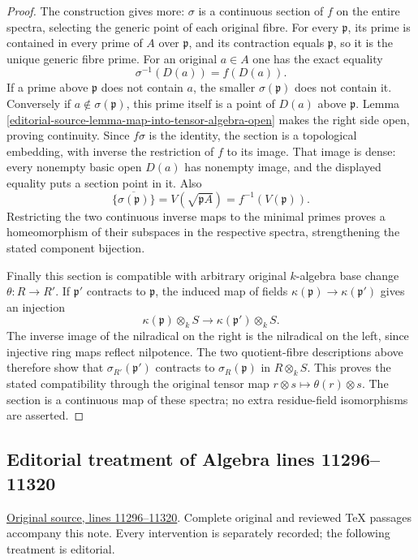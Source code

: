 \begin{proof}
The construction gives more:
$\sigma$ is a continuous section
of $f$ on the entire spectra,
selecting the generic point
of each original fibre.
For every $\mathfrak p$, its
prime is contained in every
prime of $A$ over $\mathfrak p$,
and its contraction equals
$\mathfrak p$, so it is the
unique generic fibre prime.
For an original $a\in A$ one
has the exact equality
$$
\sigma^{-1}(D(a))=f(D(a)).
$$
If a prime above $\mathfrak p$
does not contain $a$, the
smaller $\sigma(\mathfrak p)$
does not contain it. Conversely
if $a\notin\sigma(\mathfrak p)$,
this prime itself is a point
of $D(a)$ above $\mathfrak p$.
Lemma \ref{editorial-source-lemma-map-into-tensor-algebra-open}
makes the right side open,
proving continuity. Since
$f\sigma$ is the identity,
the section is a topological
embedding, with inverse the
restriction of $f$ to its
image. That image is dense:
every nonempty basic open
$D(a)$ has nonempty image,
and the displayed equality
puts a section point in it.
Also
$$
\overline{\{\sigma(\mathfrak p)\}}
=V(\sqrt{\mathfrak pA})
=f^{-1}(V(\mathfrak p)).
$$
Restricting the two continuous
inverse maps to the minimal
primes proves a homeomorphism
of their subspaces in the
respective spectra, strengthening
the stated component bijection.

Finally this section is
compatible with arbitrary
original $k$-algebra base change
$\theta:R\to R'$. If $\mathfrak p'$
contracts to $\mathfrak p$,
the induced map of fields
$\kappa(\mathfrak p)\to\kappa(\mathfrak p')$
gives an injection
$$
\kappa(\mathfrak p)\otimes_k S
\longrightarrow\kappa(\mathfrak p')\otimes_k S.
$$
The inverse image of the
nilradical on the right is
the nilradical on the left,
since injective ring maps
reflect nilpotence. The two
quotient-fibre descriptions
above therefore show that
$\sigma_{R'}(\mathfrak p')$
contracts to
$\sigma_R(\mathfrak p)$ in
$R\otimes_k S$. This proves
the stated compatibility
through the original tensor
map $r\otimes s\mapsto\theta(r)\otimes s$.
The section is a continuous
map of these spectra; no
extra residue-field
isomorphisms are asserted.
\end{proof}


\subsection{Editorial treatment of Algebra lines 11296--11320}

\hypertarget{algebra-context-142}{}

\noindent\href{https://github.com/stacks/stacks-project/blob/a04446e57ec1fbc252a871afcec7752fb2807b14/algebra.tex\#L11296}{Original source, lines 11296--11320}. Complete original and reviewed TeX passages accompany this note. Every intervention is separately recorded; the following treatment is editorial.


